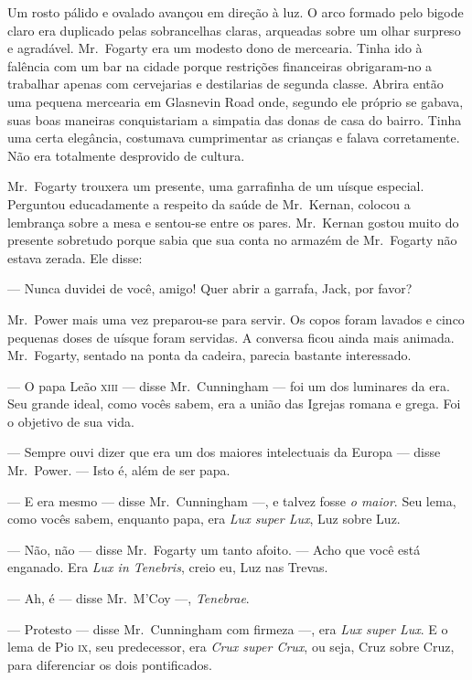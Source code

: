 Um rosto pálido e ovalado avançou em direção à luz.  O arco formado pelo bigode
claro era duplicado pelas sobrancelhas claras, arqueadas sobre um olhar
surpreso e agradável.  Mr.~Fogarty era um modesto dono de mercearia.  Tinha ido
à falência com um bar na cidade porque restrições financeiras obrigaram-no a
trabalhar apenas com cervejarias e destilarias de segunda classe.  Abrira então
uma pequena mercearia em Glasnevin Road onde, segundo ele próprio se gabava,
suas boas maneiras conquistariam a simpatia das donas de casa do bairro.  Tinha
uma certa elegância, costumava cumprimentar as crianças e falava corretamente.
Não era totalmente desprovido de cultura.

Mr.~Fogarty trouxera um presente, uma garrafinha de um uísque especial.
Perguntou educadamente a respeito da saúde de Mr.~Kernan, colocou a lembrança
sobre a mesa e sentou-se entre os pares.  Mr.~Kernan gostou muito do presente
sobretudo porque sabia que sua conta no armazém de Mr.~Fogarty não estava
zerada.  Ele disse:

--- Nunca duvidei de você, amigo!  Quer abrir a garrafa, Jack, por favor?

Mr.~Power mais uma vez preparou-se para servir.  Os copos foram lavados e cinco
pequenas doses de uísque foram servidas.  A conversa ficou ainda mais animada.
Mr.~Fogarty, sentado na ponta da cadeira, parecia bastante interessado.

--- O papa Leão \textsc{xiii} --- disse Mr.~Cunningham --- foi um dos luminares da era.
Seu grande ideal, como vocês sabem, era a união das Igrejas romana e grega.
Foi o objetivo de sua vida.

--- Sempre ouvi dizer que era um dos maiores intelectuais da Europa --- disse
Mr.~Power.  --- Isto é, além de ser papa.

--- E era mesmo --- disse Mr.~Cunningham ---, e talvez fosse \textit{o maior}.
Seu lema, como vocês sabem, enquanto papa, era \textit{Lux super Lux}, Luz
sobre Luz.

--- Não, não --- disse Mr.~Fogarty um tanto afoito.  --- Acho que você está
enganado.  Era \textit{Lux in Tenebris}, creio eu, Luz nas Trevas.

--- Ah, é --- disse Mr.~M’Coy ---, \textit{Tenebrae}.

--- Protesto --- disse Mr.~Cunningham com firmeza ---, era \textit{Lux super
Lux}.  E o lema de Pio \textsc{ix}, seu predecessor, era \textit{Crux super Crux}, ou
seja, Cruz sobre Cruz, para diferenciar os dois pontificados.

